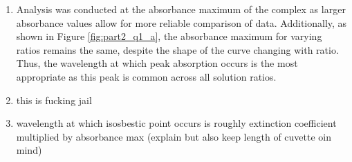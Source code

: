 \begin{enumerate}
    \item Analysis was conducted at the absorbance maximum of the  complex as larger absorbance values allow for more reliable comparison of data. Additionally, as shown in Figure \ref{fig:part2_q1_a}, the absorbance maximum for varying ratios remains the same, despite the shape of the curve changing with ratio. Thus, the wavelength at which peak absorption occurs is the most appropriate as this peak is common across all solution ratios.
    \item this is fucking jail
    \item wavelength at which isosbestic point occurs is roughly extinction coefficient multiplied by absorbance max (explain but also keep length of cuvette oin mind)
\end{enumerate}


